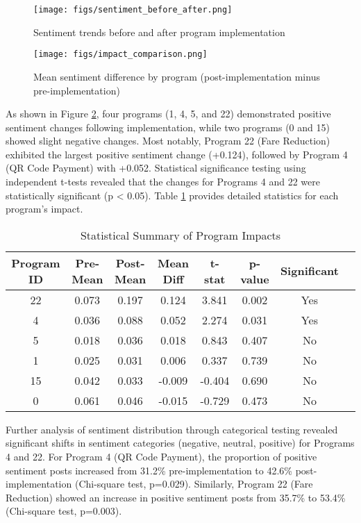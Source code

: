 \documentclass[a4paper,fleqn,12pt]{cas-sc}
\begin{document}
\begin{figure}[h]
\centering
\texttt{[image: figs/sentiment\_before\_after.png]}
\caption{Sentiment trends before and after program implementation}
\label{fig:sentiment_before_after}
\end{figure}

\begin{figure}[h]
\centering
\texttt{[image: figs/impact\_comparison.png]}
\caption{Mean sentiment difference by program (post-implementation minus pre-implementation)}
\label{fig:impact_comparison}
\end{figure}

As shown in Figure \ref{fig:impact_comparison}, four programs (1, 4, 5, and 22) demonstrated positive sentiment changes following implementation, while two programs (0 and 15) showed slight negative changes. Most notably, Program 22 (Fare Reduction) exhibited the largest positive sentiment change (+0.124), followed by Program 4 (QR Code Payment) with +0.052. Statistical significance testing using independent t-tests revealed that the changes for Programs 4 and 22 were statistically significant (p < 0.05). Table \ref{tab:stats_summary} provides detailed statistics for each program's impact.

\begin{table}[h]
\centering
\caption{Statistical Summary of Program Impacts}
\label{tab:stats_summary}
\begin{tabular}{cccccccc}
\hline
Program ID & Pre-Mean & Post-Mean & Mean Diff & t-stat & p-value & Significant \\
\hline
22 & 0.073 & 0.197 & 0.124 & 3.841 & 0.002 & Yes \\
4 & 0.036 & 0.088 & 0.052 & 2.274 & 0.031 & Yes \\
5 & 0.018 & 0.036 & 0.018 & 0.843 & 0.407 & No \\
1 & 0.025 & 0.031 & 0.006 & 0.337 & 0.739 & No \\
15 & 0.042 & 0.033 & -0.009 & -0.404 & 0.690 & No \\
0 & 0.061 & 0.046 & -0.015 & -0.729 & 0.473 & No \\
\hline
\end{tabular}
\end{table}

Further analysis of sentiment distribution through categorical testing revealed significant shifts in sentiment categories (negative, neutral, positive) for Programs 4 and 22. For Program 4 (QR Code Payment), the proportion of positive sentiment posts increased from 31.2\% pre-implementation to 42.6\% post-implementation (Chi-square test, p=0.029). Similarly, Program 22 (Fare Reduction) showed an increase in positive sentiment posts from 35.7\% to 53.4\% (Chi-square test, p=0.003).
\end{document}
